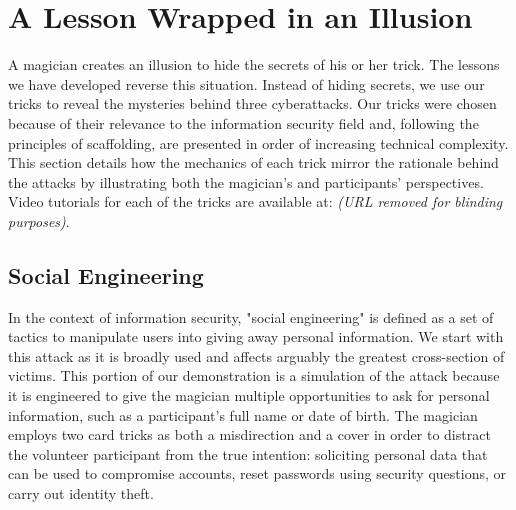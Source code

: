 \section{A Lesson Wrapped in an Illusion}
\label{SEC:background}


A magician creates an illusion to hide the secrets of his or her trick.
The lessons we have developed reverse this situation.
Instead of hiding secrets, we use our tricks to reveal
the mysteries behind
three cyberattacks.
Our tricks were chosen because of their relevance to the information
security field and, following the principles of scaffolding, are presented
in order of increasing technical complexity.
This section details how the mechanics of each trick mirror the
rationale behind the attacks by illustrating both the magician's and
participants' perspectives.  Video tutorials for each of the tricks are
available at: \textit{(URL removed for blinding purposes)}.


%
%

\subsection{Social Engineering}

In the context of information security,
"social engineering" is defined as a set
of tactics to manipulate users into giving away personal information.
We start with this attack as it is broadly used and affects arguably the
greatest cross-section of victims.  This portion of our demonstration
is a simulation of the attack because it is engineered to give
the magician multiple opportunities to ask for personal information,
such as a participant's full name or date of birth.
The magician employs two card tricks
as
both a misdirection and a cover
in order to
distract the
volunteer participant from
the true intention: soliciting
personal data that
can be used to compromise accounts,
reset passwords using security questions, or
carry out identity theft.

